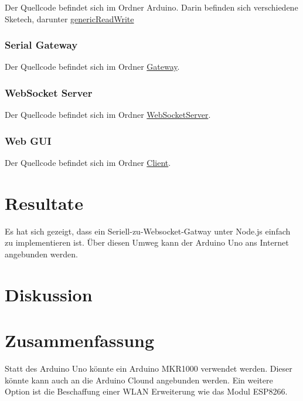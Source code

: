 \documentclass[
  ngerman,
  a4paper,
  12pt]{scrartcl}
\begin{document}
Der Quellcode befindet sich im Ordner Arduino. Darin befinden sich
verschiedene Sketech, darunter
\href{../../arduino/genericReadWrite/genericReadWrite.ino}{genericReadWrite}

\hypertarget{serial-gateway-1}{%
\subsubsection{Serial Gateway}\label{serial-gateway-1}}

Der Quellcode befindet sich im Ordner
\href{../../gateway/gateway.js}{Gateway}.

\hypertarget{websocket-server}{%
\subsubsection{WebSocket Server}\label{websocket-server}}

Der Quellcode befindet sich im Ordner
\href{../../websocketserver/websocketserver.js}{WebSocketServer}.

\hypertarget{web-gui}{%
\subsubsection{Web GUI}\label{web-gui}}

Der Quellcode befindet sich im Ordner
\href{../../client/index.html}{Client}.

\hypertarget{resultate}{%
\section{Resultate}\label{resultate}}

Es hat sich gezeigt, dass ein Seriell-zu-Websocket-Gatway unter Node.js
einfach zu implementieren ist. Über diesen Umweg kann der Arduino Uno
ans Internet angebunden werden.

\hypertarget{diskussion}{%
\section{Diskussion}\label{diskussion}}

\hypertarget{zusammenfassung}{%
\section{Zusammenfassung}\label{zusammenfassung}}

Statt des Arduino Uno könnte ein Arduino MKR1000 verwendet werden.
Dieser könnte kann auch an die Arduino Clound angebunden werden. Ein
weitere Option ist die Beschaffung einer WLAN Erweiterung wie das Modul
ESP8266.
\end{document}
